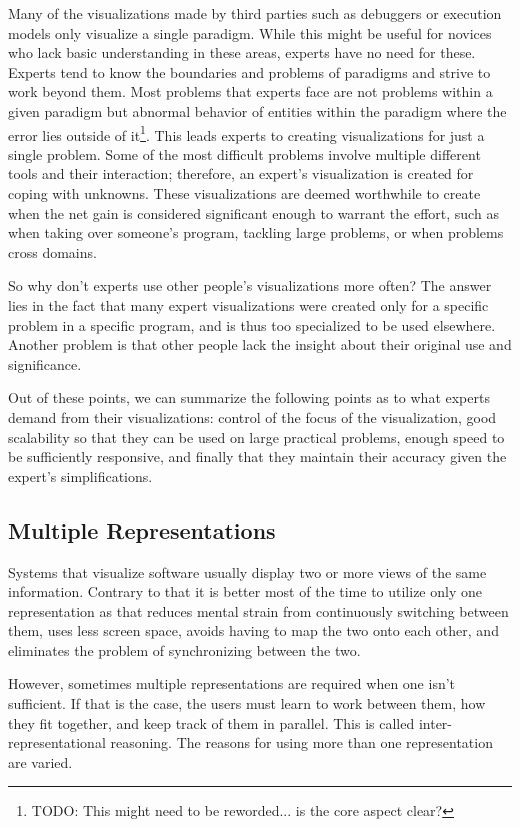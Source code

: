 \documentclass[11pt, a4paper, ngerman, twoside]{article}
\theoremstyle{plain}\newtheorem{Lemma}{Lemma}
\theoremstyle{plain}\newtheorem{Satz}[Lemma]{Satz}
\theoremstyle{definition}\newtheorem{Definition}[Lemma]{Definition}
\theoremstyle{definition}\newtheorem*{Beispiel}{Beispiel}
\theoremstyle{remark}\newtheorem*{Bemerkung}{Bemerkung}
\begin{document}
Many of the visualizations made by third parties such as debuggers or execution models only visualize a single paradigm. While this might be useful for novices who lack basic understanding in these areas, experts have no need for these. Experts tend to know the boundaries and problems of paradigms and strive to work beyond them. Most problems that experts face are not problems within a given paradigm but abnormal behavior of entities within the paradigm where the error lies outside of it\footnote{TODO: This might need to be reworded... is the core aspect clear?}. This leads experts to creating visualizations for just a single problem. Some of the most difficult problems involve multiple different tools and their interaction; therefore, an expert's visualization is created for coping with unknowns. These visualizations are deemed worthwhile to create when the net gain is considered significant enough to warrant the effort, such as when taking over someone's program, tackling large problems, or when problems cross domains.

So why don't experts use other people's visualizations more often? The answer lies in the fact that many expert visualizations were created only for a specific problem in a specific program, and is thus too specialized to be used elsewhere. Another problem is that other people lack the insight about their original use and significance.

Out of these points, we can summarize the following points as to what experts demand from their visualizations: control of the focus of the visualization, good scalability so that they can be used on large practical problems, enough speed to be sufficiently responsive, and finally that they maintain their accuracy given the expert's simplifications.

\subsection{Multiple Representations}

Systems that visualize software usually display two or more views of the same information. Contrary to that it is better most of the time to utilize only one representation as that reduces mental strain from continuously switching between them, uses less screen space, avoids having to map the two onto each other, and eliminates the problem of synchronizing between the two.

However, sometimes multiple representations are required when one isn't sufficient. If that is the case, the users must learn to work between them, how they fit together, and keep track of them in parallel. This is called inter-representational reasoning. The reasons for using more than one representation are varied.
\end{document}
